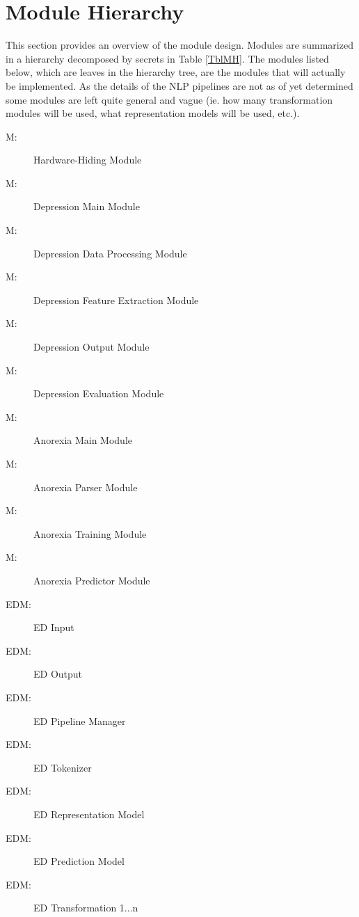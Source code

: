 \documentclass[12pt, titlepage]{article}
\newcounter{mnum}
\newcommand{\mthemnum}{M\themnum}
\newcounter{edmnum}
\newcommand{\edmthemnum}{EDM\theedmnum}
\begin{document}
\section{Module Hierarchy} \label{SecMH}

This section provides an overview of the module design. Modules are summarized
in a hierarchy decomposed by secrets in Table \ref{TblMH}. The modules listed
below, which are leaves in the hierarchy tree, are the modules that will
actually be implemented. As the details of the NLP pipelines are not as of yet determined some modules are left quite general and vague (ie. how many transformation modules will be used, what representation models will be used, etc.).
\begin{description}
\item [ \mthemnum \label{mHH}:] Hardware-Hiding Module
\item [ \mthemnum \label{DNOM1}:] Depression Main Module
\item [ \mthemnum \label{DNOM2}:] Depression Data Processing Module
\item [ \mthemnum \label{DNOM3}:] Depression Feature Extraction Module
\item [ \mthemnum \label{DNOM4}:] Depression Output Module
\item [ \mthemnum \label{DNOM5}:] Depression Evaluation Module
\item [ \mthemnum \label{ANOM1}:] Anorexia Main Module
\item [ \mthemnum \label{ANOM2}:] Anorexia Parser Module
\item [ \mthemnum \label{ANOM3}:] Anorexia Training Module
\item [ \mthemnum \label{ANOM4}:] Anorexia Predictor Module
\item [ \edmthemnum \label{edmI}:] ED Input
\item [ \edmthemnum \label{edmO}:] ED Output
\item [ \edmthemnum \label{edmPipeline}:] ED Pipeline Manager
\item [ \edmthemnum \label{edmToken}:] ED Tokenizer
\item [ \edmthemnum \label{edmRM}:] ED Representation Model
\item [ \edmthemnum \label{edmPM}:] ED Prediction Model
\item [ \edmthemnum \label{edmTrans}:] ED Transformation 1...n
\end{description}
\end{document}
